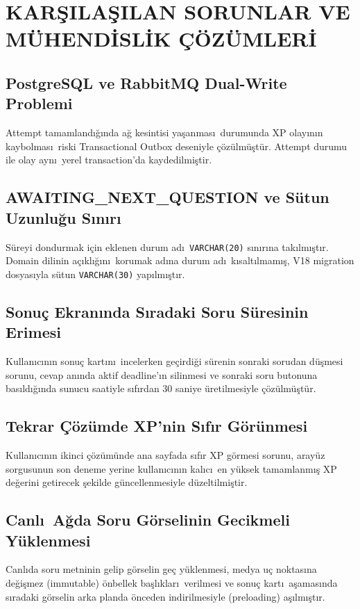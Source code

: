 \documentclass[conference,a4paper]{IEEEtran}
\begin{document}
\section{KAR\c{S}ILA\c{S}ILAN SORUNLAR VE M\"{U}HEND\.{I}SL\.{I}K \c{C}\"{O}Z\"{U}MLER\.{I}}

\subsection{PostgreSQL ve RabbitMQ Dual-Write Problemi}
Attempt tamamland\i\u{g}\i nda a\u{g} kesintisi ya\c{s}anmas\i\ durumunda XP olay\i n\i n kaybolmas\i\ riski Transactional Outbox deseniyle \c{c}\"{o}z\"{u}lm\"{u}\c{s}t\"{u}r. Attempt durumu ile olay ayn\i\ yerel transaction'da kaydedilmi\c{s}tir.

\subsection{AWAITING\_NEXT\_QUESTION ve S\"{u}tun Uzunlu\u{g}u S\i n\i r\i}
S\"{u}reyi dondurmak i\c{c}in eklenen durum ad\i\ \texttt{VARCHAR(20)} s\i n\i r\i na tak\i lm\i\c{s}t\i r. Domain dilinin a\c{c}\i kl\i\u{g}\i n\i\ korumak ad\i na durum ad\i\ k\i salt\i lmam\i\c{s}, V18 migration dosyas\i yla s\"{u}tun \texttt{VARCHAR(30)} yap\i lm\i\c{s}t\i r.

\subsection{Sonu\c{c} Ekran\i nda S\i radaki Soru S\"{u}resinin Erimesi}
Kullan\i c\i n\i n sonu\c{c} kart\i n\i\ incelerken ge\c{c}irdi\u{g}i s\"{u}renin sonraki sorudan d\"{u}\c{s}mesi sorunu, cevap an\i nda aktif deadline'\i n silinmesi ve sonraki soru butonuna bas\i ld\i\u{g}\i nda sunucu saatiyle s\i f\i rdan 30 saniye \"{u}retilmesiyle \c{c}\"{o}z\"{u}lm\"{u}\c{s}t\"{u}r.

\subsection{Tekrar \c{C}\"{o}z\"{u}mde XP'nin S\i f\i r G\"{o}r\"{u}nmesi}
Kullan\i c\i n\i n ikinci \c{c}\"{o}z\"{u}m\"{u}nde ana sayfada sıfır XP g\"{o}rmesi sorunu, aray\"{u}z sorgusunun son deneme yerine kullan\i c\i n\i n kal\i c\i\ en y\"{u}ksek tamamlanm\i\c{s} XP de\u{g}erini getirecek \c{s}ekilde g\"{u}ncellenmesiyle d\"{u}zeltilmi\c{s}tir.

\subsection{Canl\i\ A\u{g}da Soru G\"{o}rselinin Gecikmeli Y\"{u}klenmesi}
Canl\i da soru metninin gelip g\"{o}rselin ge\c{c} y\"{u}klenmesi, medya u\c{c} noktas\i na de\u{g}i\c{s}mez (immutable) \"{o}nbellek ba\c{s}l\i klar\i\ verilmesi ve sonu\c{c} kart\i\ a\c{s}amas\i nda s\i radaki g\"{o}rselin arka planda \"{o}nceden indirilmesiyle (preloading) a\c{s}\i lm\i\c{s}t\i r.
\end{document}

